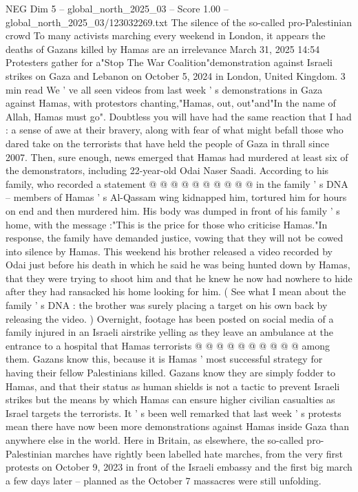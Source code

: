 \begin{textsample}{NEG Dim 5 – global\_north\_2025\_03 – Score 1.00 – global\_north\_2025\_03/123032269.txt}  \label{ex:f5_neg_296}
The silence of the so-called pro-Palestinian crowd To many activists marching every weekend in London, it appears the deaths of Gazans killed by Hamas are an irrelevance March 31, 2025 14:54 Protesters gather for a"Stop The War Coalition"demonstration against Israeli strikes on Gaza and Lebanon on October 5, 2024 in London, United Kingdom. 3 min read We ' ve all seen videos from last week ' s demonstrations in Gaza against Hamas, with protestors chanting,"Hamas, out, out"and"In the name of Allah, Hamas must go".
Doubtless you will have had the same reaction that I had : a sense of awe at their bravery, along with fear of what might befall those who dared take on the terrorists that have held the people of Gaza in thrall since 2007.
Then, sure enough, news emerged that Hamas had murdered at least six of the demonstrators, including 22-year-old Odai Naser Saadi.
According to his family, who recorded a statement @ @ @ @ @ @ @ @ @ @ in the family ' s DNA -- members of Hamas ' s Al-Qassam wing kidnapped him, tortured him for hours on end and then murdered him.
His body was dumped in front of his family ' s home, with the message :"This is the price for those who criticise Hamas."In response, the family have demanded justice, vowing that they will not be cowed into silence by Hamas.
This weekend his brother released a video recorded by Odai just before his death in which he said he was being hunted down by Hamas, that they were trying to shoot him and that he knew he now had nowhere to hide after they had ransacked his home looking for him. ( See what I mean about the family ' s DNA : the brother was surely placing a target on his own back by releasing the video. ) Overnight, footage has been posted on social media of a family injured in an Israeli airstrike yelling as they leave an ambulance at the entrance to a hospital that Hamas terrorists @ @ @ @ @ @ @ @ @ @ among them.
Gazans know this, because it is Hamas ' most successful strategy for having their fellow Palestinians killed.
Gazans know they are simply fodder to Hamas, and that their status as human shields is not a tactic to prevent Israeli strikes but the means by which Hamas can ensure higher civilian casualties as Israel targets the terrorists.
It ' s been well remarked that last week ' s protests mean there have now been more demonstrations against Hamas inside Gaza than anywhere else in the world.
Here in Britain, as elsewhere, the so-called pro-Palestinian marches have rightly been labelled hate marches, from the very first protests on October 9, 2023 in front of the Israeli embassy and the first big march a few days later -- planned as the October 7 massacres were still unfolding.

\end{textsample}
